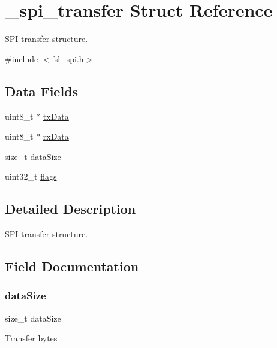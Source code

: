 \hypertarget{struct__spi__transfer}{}\section{\+\_\+spi\+\_\+transfer Struct Reference}
\label{struct__spi__transfer}


S\+PI transfer structure.  




{\ttfamily \#include $<$fsl\+\_\+spi.\+h$>$}

\subsection*{Data Fields}
\begin{DoxyCompactItemize}
\item 
uint8\+\_\+t $\ast$ \mbox{\hyperlink{struct__spi__transfer_a03c054bb486fb65133eb9f6849266fb1}{tx\+Data}}
\item 
uint8\+\_\+t $\ast$ \mbox{\hyperlink{struct__spi__transfer_ab83c0e07099df7beb8e491cb91914de0}{rx\+Data}}
\item 
size\+\_\+t \mbox{\hyperlink{struct__spi__transfer_a78f9703861dd365a513c2c5aab9f9239}{data\+Size}}
\item 
uint32\+\_\+t \mbox{\hyperlink{struct__spi__transfer_a773b39d480759f67926cb18ae2219281}{flags}}
\end{DoxyCompactItemize}


\subsection{Detailed Description}
S\+PI transfer structure. 

\subsection{Field Documentation}
\mbox{\label{struct__spi__transfer_a78f9703861dd365a513c2c5aab9f9239}} 
\subsubsection{\texorpdfstring{dataSize}{dataSize}}
{\footnotesize\ttfamily size\+\_\+t data\+Size}

Transfer bytes \mbox{\label{struct__spi__transfer_a773b39d480759f67926cb18ae2219281}} 
